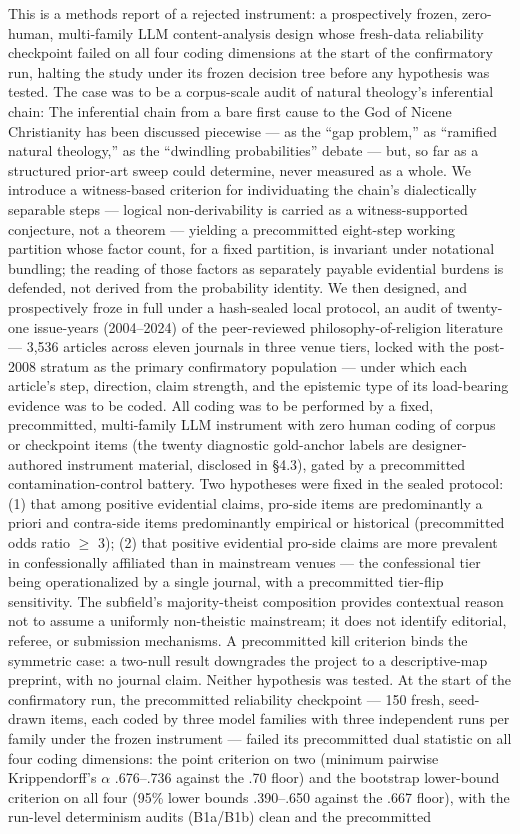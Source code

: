 This is a methods report of a rejected instrument: a prospectively frozen, zero-human, multi-family LLM content-analysis design whose fresh-data reliability checkpoint failed on all four coding dimensions at the start of the confirmatory run, halting the study under its frozen decision tree before any hypothesis was tested. The case was to be a corpus-scale audit of natural theology's inferential chain: The inferential chain from a bare first cause to the God of Nicene Christianity has been discussed piecewise --- as the ``gap problem,'' as ``ramified natural theology,'' as the ``dwindling probabilities'' debate --- but, so far as a structured prior-art sweep could determine, never measured as a whole. We introduce a witness-based criterion for individuating the chain's dialectically separable steps --- logical non-derivability is carried as a witness-supported conjecture, not a theorem --- yielding a precommitted eight-step working partition whose factor count, for a fixed partition, is invariant under notational bundling; the reading of those factors as separately payable evidential burdens is defended, not derived from the probability identity. We then designed, and prospectively froze in full under a hash-sealed local protocol, an audit of twenty-one issue-years (2004--2024) of the peer-reviewed philosophy-of-religion literature --- 3,536 articles across eleven journals in three venue tiers, locked with the post-2008 stratum as the primary confirmatory population --- under which each article's step, direction, claim strength, and the epistemic type of its load-bearing evidence was to be coded. All coding was to be performed by a fixed, precommitted, multi-family LLM instrument with zero human coding of corpus or checkpoint items (the twenty diagnostic gold-anchor labels are designer-authored instrument material, disclosed in \S{}4.3), gated by a precommitted contamination-control battery. Two hypotheses were fixed in the sealed protocol: (1) that among positive evidential claims, pro-side items are predominantly a priori and contra-side items predominantly empirical or historical (precommitted odds ratio $\ge$ 3); (2) that positive evidential pro-side claims are more prevalent in confessionally affiliated than in mainstream venues --- the confessional tier being operationalized by a single journal, with a precommitted tier-flip sensitivity. The subfield's majority-theist composition provides contextual reason not to assume a uniformly non-theistic mainstream; it does not identify editorial, referee, or submission mechanisms. A precommitted kill criterion binds the symmetric case: a two-null result downgrades the project to a descriptive-map preprint, with no journal claim. Neither hypothesis was tested. At the start of the confirmatory run, the precommitted reliability checkpoint --- 150 fresh, seed-drawn items, each coded by three model families with three independent runs per family under the frozen instrument --- failed its precommitted dual statistic on all four coding dimensions: the point criterion on two (minimum pairwise Krippendorff's $\alpha$ .676--.736 against the .70 floor) and the bootstrap lower-bound criterion on all four (95\% lower bounds .390--.650 against the .667 floor), with the run-level determinism audits (B1a/B1b) clean and the precommitted 